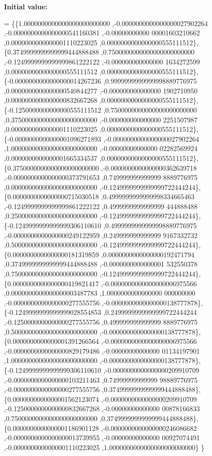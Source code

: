 {\bfseries Initial value\+:}
\begin{DoxyCode}
= \{\{1.0000000000000000000000000 ,-0.0000000000000000027902264 ,-0.0000000000000000541160381 ,-0.00000000000
      00001603210662 ,0.0000000000000001110223025 ,0.0000000000000000555111512\},
\{0.3749999999999999444888488 ,0.7500000000000000000000000 ,-0.1249999999999999861222122 ,-0.000000000000000
      1634272599 ,0.0000000000000000555111512 ,0.0000000000000000555111512\},
\{-0.0000000000000000014267236 ,0.9999999999999998889776975 ,0.0000000000000000540844277 ,-0.000000000000000
      1902710950 ,0.0000000000000000832667268 ,0.0000000000000000555111512\},
\{-0.1250000000000000555111512 ,0.7500000000000000000000000 ,0.3750000000000000000000000 ,-0.000000000000000
      2251507987 ,0.0000000000000001110223025 ,0.0000000000000000555111512\},
\{-0.0000000000000001096271893 ,-0.0000000000000000027902264 ,1.0000000000000000000000000 ,-0.00000000000000
      02282569924 ,0.0000000000000001665334537 ,0.0000000000000000555111512\},
\{0.3750000000000000000000000 ,-0.0000000000000000362639718 ,-0.0000000000000000373791653 ,0.749999999999999
      8889776975 ,0.0000000000000000000000000 ,-0.1249999999999999722444244\},
\{0.0000000000000000715030518 ,0.4999999999999998334665463 ,-0.1249999999999999861222122 ,0.4999999999999999
      444888488 ,0.2500000000000000000000000 ,-0.1249999999999999722444244\},
\{-0.1249999999999999306110610 ,0.4999999999999998889776975 ,-0.0000000000000000249122959 ,0.249999999999999
      9167332732 ,0.5000000000000000000000000 ,-0.1249999999999999722444244\},
\{0.0000000000000000181319859 ,0.0000000000000000192471794 ,0.3749999999999999444888488 ,-0.0000000000000001
      532550378 ,0.7500000000000000000000000 ,-0.1249999999999999722444244\},
\{0.0000000000000000419821417 ,-0.0000000000000000006975566 ,0.0000000000000000003487783 ,1.0000000000000000
      000000000 ,-0.0000000000000000277555756 ,-0.0000000000000000138777878\},
\{-0.1249999999999999028554853 ,0.2499999999999999722444244 ,-0.1250000000000000277555756 ,0.499999999999999
      8889776975 ,0.5000000000000000000000000 ,-0.0000000000000000138777878\},
\{0.0000000000000001391266564 ,-0.0000000000000000006975566 ,-0.0000000000000000829179486 ,-0.00000000000000
      01134197901 ,1.0000000000000000000000000 ,-0.0000000000000000138777878\},
\{-0.1249999999999999306110610 ,-0.0000000000000000209910709 ,-0.0000000000000000103211463 ,0.74999999999999
      98889776975 ,-0.0000000000000000277555756 ,0.3749999999999999444888488\},
\{0.0000000000000001562123074 ,-0.0000000000000000209910709 ,-0.1250000000000000832667268 ,-0.00000000000000
      00878166833 ,0.7500000000000000000000000 ,0.3749999999999999444888488\},
\{0.0000000000000001186901128 ,-0.0000000000000000246086682 ,-0.0000000000000000013739955 ,-0.00000000000000
      00927074491 ,-0.0000000000000001110223025 ,1.0000000000000000000000000\}
\}
\end{DoxyCode}
\mbox{\label{a00449_ab0d769e56dcd346024ae834d5a7fb7ce}} 
